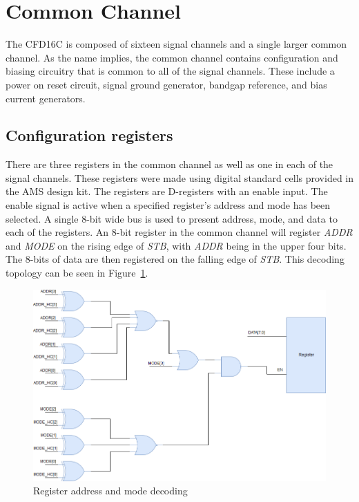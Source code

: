 \documentclass[12pt,oneside,final]{siuethesis}
\theoremstyle{definition}
\begin{document}

\section{Common Channel}
\par The CFD16C is composed of sixteen signal channels and a single larger common channel. As the name implies, the common channel contains configuration and biasing circuitry that is common to all of the signal channels. These include a power on reset circuit, signal ground generator, bandgap reference, and bias current generators.

\subsection{Configuration registers}
\par There are three registers in the common channel as well as one in each of the signal channels. These registers were made using digital standard cells provided in the AMS design kit. The registers are D-registers with an enable input. The enable signal is active when a specified register's address and mode has been selected. A single 8-bit wide bus is used to present address, mode, and data to each of the registers. An 8-bit register in the common channel will register \emph{ADDR} and \emph{MODE} on the rising edge of \emph{STB}, with \emph{ADDR} being in the upper four bits. The 8-bits of data are then registered on the falling edge of \emph{STB}. This decoding topology can be seen in Figure~\ref{fig:register}.

\begin{figure}[htbp!]
 \centering
 \includegraphics[scale=.45,keepaspectratio=true]{./ch3_figures/Register.png}
 \caption{Register address and mode decoding}
 \label{fig:register}
\end{figure}
\end{document}
